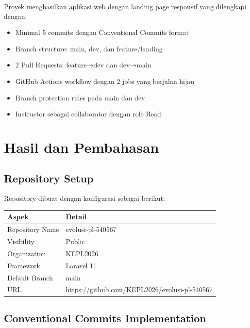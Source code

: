 \documentclass[a4paper,oneside,11pt]{book}
\begin{document}
Proyek menghasilkan aplikasi web dengan landing page responsif yang dilengkapi dengan:
\begin{itemize}
    \item Minimal 5 commits dengan Conventional Commits format
    \item Branch structure: main, dev, dan feature/landing
    \item 2 Pull Requests: feature→dev dan dev→main
    \item GitHub Actions workflow dengan 2 jobs yang berjalan hijau
    \item Branch protection rules pada main dan dev
    \item Instructor sebagai collaborator dengan role Read
\end{itemize}

\newpage


\chapter{Hasil dan Pembahasan}

\section{Repository Setup}

Repository dibuat dengan konfigurasi sebagai berikut:

\begin{center}
\begin{tabular}{|l|l|}
\hline
\textbf{Aspek} & \textbf{Detail} \\
\hline
Repository Name & evolusi-pl-540567 \\
\hline
Visibility & Public \\
\hline
Organization & KEPL2026 \\
\hline
Framework & Laravel 11 \\
\hline
Default Branch & main \\
\hline
URL & https://github.com/KEPL2026/evolusi-pl-540567 \\
\hline
\end{tabular}
\end{center}

\section{Conventional Commits Implementation}
\end{document}
